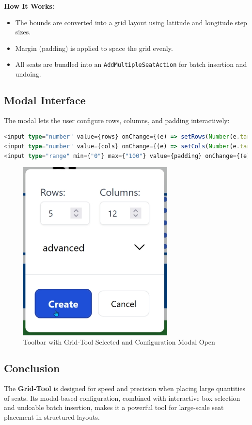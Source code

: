 \textbf{How It Works:}
\begin{itemize}
    \item The bounds are converted into a grid layout using latitude and longitude step sizes.
    \item Margin (padding) is applied to space the grid evenly.
    \item All seats are bundled into an \texttt{AddMultipleSeatAction} for batch insertion and undoing.
\end{itemize}

\subsection{Modal Interface}
The modal lets the user configure rows, columns, and padding interactively:

\begin{lstlisting}[language=TypeScript, caption=Modal Input Fields, label=lst:grid-modal-ui]
<input type="number" value={rows} onChange={(e) => setRows(Number(e.target.value))} />
<input type="number" value={cols} onChange={(e) => setCols(Number(e.target.value))} />
<input type="range" min={"0"} max={"100"} value={padding} onChange={(e) => setPadding(Number(e.target.value))} />
\end{lstlisting}

\begin{figure}[H]
    \centering
    \includegraphics[width=0.7\textwidth]{pics/grid-tool.png}
    \caption{Toolbar with Grid-Tool Selected and Configuration Modal Open}
    \label{fig:grid-tool-toolbar}
\end{figure}

\subsection{Conclusion}
The \textbf{Grid-Tool} is designed for speed and precision when placing large quantities of seats. Its modal-based configuration, combined with interactive box selection and undoable batch insertion, makes it a powerful tool for large-scale seat placement in structured layouts.
